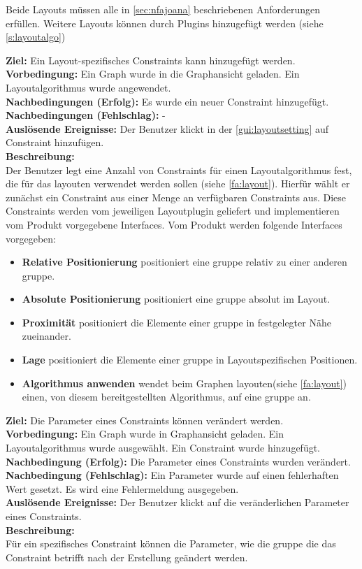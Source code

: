 Beide Layouts müssen alle in \ref{sec:nfajoana} beschriebenen Anforderungen erfüllen.
Weitere Layouts können durch Plugins hinzugefügt werden (siehe \ref{s:layoutalgo})

\label{fa:constraints}
\textbf{Ziel:} Ein Layout-spezifisches Constraints kann hinzugefügt werden.\\
\textbf{Vorbedingung:} Ein Graph wurde in die Graphansicht geladen. Ein Layoutalgorithmus wurde angewendet.\\
\textbf{Nachbedingungen (Erfolg):} Es wurde ein neuer Constraint hinzugefügt.\\
\textbf{Nachbedingungen (Fehlschlag):} -\\
\textbf{Auslösende Ereignisse:} Der Benutzer klickt in der \ref{gui:layoutsetting} auf Constraint hinzufügen.\\
\textbf{Beschreibung: } \\
Der Benutzer legt eine Anzahl von Constraints für einen Layoutalgorithmus fest, die für das layouten verwendet werden sollen (siehe \ref{fa:layout}). Hierfür wählt er zunächst ein Constraint aus einer Menge an verfügbaren Constraints aus. Diese Constraints werden vom jeweiligen Layoutplugin geliefert und implementieren vom Produkt vorgegebene Interfaces. Vom Produkt werden folgende Interfaces vorgegeben:
\begin{itemize}[nolistsep]
  \item \textbf{Relative Positionierung} positioniert eine \gls{gruppe} relativ zu einer anderen \gls{gruppe}.
  \item \textbf{Absolute Positionierung} positioniert eine \gls{gruppe} absolut im Layout.
  \item \textbf{Proximität} positioniert die Elemente einer \gls{gruppe} in festgelegter Nähe zueinander.
  \item \textbf{Lage} positioniert die Elemente einer \gls{gruppe} in Layoutspezifischen Positionen.
  \item \textbf{Algorithmus anwenden} wendet beim Graphen layouten(siehe \ref{fa:layout}) einen, von diesem bereitgestellten Algorithmus, auf eine \gls{gruppe} an. 
\end{itemize}

\label{fa:constraintsettings}
\textbf{Ziel:} Die Parameter eines Constraints können verändert werden. \\
\textbf{Vorbedingung:} Ein Graph wurde in Graphansicht geladen. Ein Layoutalgorithmus wurde ausgewählt. Ein Constraint wurde hinzugefügt. \\
\textbf{Nachbedingung (Erfolg):} Die Parameter eines Constraints wurden verändert. \\
\textbf{Nachbedingung (Fehlschlag):} Ein Parameter wurde auf einen fehlerhaften Wert gesetzt. Es wird eine Fehlermeldung ausgegeben. \\
\textbf{Auslösende Ereignisse:} Der Benutzer klickt auf die veränderlichen Parameter eines Constraints. \\
\textbf{Beschreibung:}\\
Für ein spezifisches Constraint können die Parameter, wie die \gls{gruppe} die das Constraint betrifft nach der Erstellung geändert werden.\\

